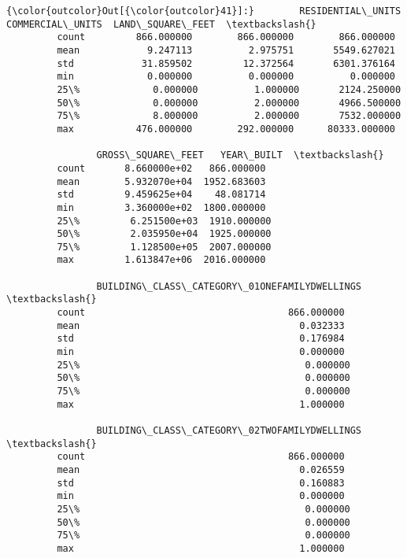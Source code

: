 \documentclass[11pt]{article}
\begin{document}
\begin{Verbatim}[commandchars=\\\{\}]
{\color{outcolor}Out[{\color{outcolor}41}]:}        RESIDENTIAL\_UNITS  COMMERCIAL\_UNITS  LAND\_SQUARE\_FEET  \textbackslash{}
         count         866.000000        866.000000        866.000000   
         mean            9.247113          2.975751       5549.627021   
         std            31.859502         12.372564       6301.376164   
         min             0.000000          0.000000          0.000000   
         25\%             0.000000          1.000000       2124.250000   
         50\%             0.000000          2.000000       4966.500000   
         75\%             8.000000          2.000000       7532.000000   
         max           476.000000        292.000000      80333.000000   
         
                GROSS\_SQUARE\_FEET   YEAR\_BUILT  \textbackslash{}
         count       8.660000e+02   866.000000   
         mean        5.932070e+04  1952.683603   
         std         9.459625e+04    48.081714   
         min         3.360000e+02  1800.000000   
         25\%         6.251500e+03  1910.000000   
         50\%         2.035950e+04  1925.000000   
         75\%         1.128500e+05  2007.000000   
         max         1.613847e+06  2016.000000   
         
                BUILDING\_CLASS\_CATEGORY\_01ONEFAMILYDWELLINGS  \textbackslash{}
         count                                    866.000000   
         mean                                       0.032333   
         std                                        0.176984   
         min                                        0.000000   
         25\%                                        0.000000   
         50\%                                        0.000000   
         75\%                                        0.000000   
         max                                        1.000000   
         
                BUILDING\_CLASS\_CATEGORY\_02TWOFAMILYDWELLINGS  \textbackslash{}
         count                                    866.000000   
         mean                                       0.026559   
         std                                        0.160883   
         min                                        0.000000   
         25\%                                        0.000000   
         50\%                                        0.000000   
         75\%                                        0.000000   
         max                                        1.000000   
         

\end{Verbatim}
\end{document}
